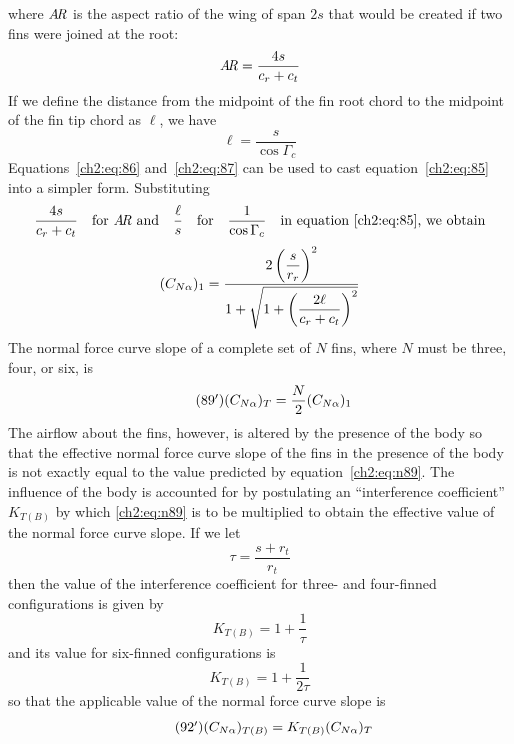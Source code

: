 where $\mathit{A\mkern-3mu R}$ is the aspect ratio of the wing of span $2s$ that would be
created if two fins were joined at the root:
\begin{equation}\label{ch2:eq:86}
\mathit{A\mkern-3mu R} = \frac{4s}{c_r + c_t}
\end{equation}
If we define the distance from the midpoint of the fin root chord to the
midpoint of the fin tip chord as $\ell$, we have
\begin{equation}\label{ch2:eq:87}
\ell = \frac{s}{\cos\Gamma_c}
\end{equation}
Equations~\eqref{ch2:eq:86} and~\eqref{ch2:eq:87} can be used to cast
equation~\eqref{ch2:eq:85} into a simpler form. Substituting
\begin{equation*}
\frac{4s}{c_r + c_t}\quad\text{for $\mathit{A\mkern-3mu R}$ and}\quad\frac{\ell}{s}\quad\text{for}\quad\frac{1}{\cos\Gamma_c}\quad\text{in equation~\eqref{ch2:eq:85}, we obtain}
\end{equation*}
\begin{equation}\label{ch2:eq:88}
(C_{N\alpha})_1 = \frac{2\left(\dfrac{s}{r_r}\right)^{2}}{1 + \sqrt{1 + \left(\dfrac{2\ell}{c_r + c_t}\right)^{2}}}
\end{equation}
The normal force curve slope of a complete set of $N$ fins, where $N$ must be
three, four, or six, is
\begin{equation*}\tag{89$'$}\label{ch2:eq:n89}
(C_{N\alpha})_T = \frac{N}{2}(C_{N\alpha})_1
\end{equation*}
The airflow about the fins, however, is altered by the presence of the body so
that the effective normal force curve slope of the fins in the presence of the
body is not exactly equal to the value predicted by
equation~\eqref{ch2:eq:n89}. The influence of the body is accounted for by
postulating an ``interference coefficient'' $K_{T(B)}$ by which
\eqref{ch2:eq:n89} is to be multiplied to obtain the effective value of the
normal force curve slope. If we let
\begin{equation*}
\tau = \frac{s + r_t}{r_t}
\end{equation*}
then the value of the interference coefficient for three- and four-finned
configurations is given by
\begin{equation*}\tag{90$'$}\label{ch2:eq:n90}
K_{T(B)} = 1 + \frac{1}{\tau}
\end{equation*}
and its value for six-finned configurations is
\begin{equation*}\tag{91$'$}\label{ch2:eq:n91}
K_{T(B)} = 1 + \frac{1}{2\tau}
\end{equation*}
so that the applicable value of the normal force curve slope is
\begin{equation*}\tag{92$'$}\label{ch2:eq:n92}
(C_{N\alpha})_{T(B)} = K_{T(B)}(C_{N\alpha})_T
\end{equation*}

